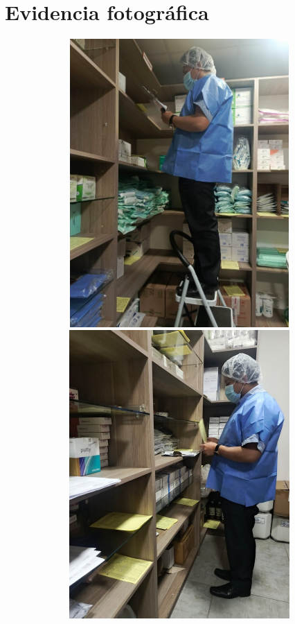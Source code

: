 \section{Evidencia fotográfica}
\begin{figure}[H]
  {\includegraphics[width=15cm, height=11cm]{images/foto1.jpg}}
  {\includegraphics[width=15cm, height=11cm]{images/foto2.jpg}}
\end{figure}

